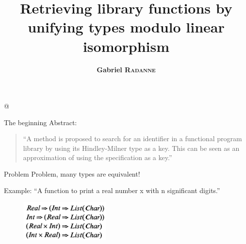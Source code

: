 \documentclass[aspectratio=169,dvipsnames,svgnames,10pt]{beamer}
\title{
  Retrieving library functions by unifying types modulo linear isomorphism\\
  


}
\author{\textbf{Gabriel \textsc{Radanne}}}
\date{}
\begin{document}
\lstMakeShortInline[keepspaces,basicstyle=\small\ttfamily]@


\begin{frame}{The beginning}
  Abstract:
  \begin{quote}
    ``A method is proposed to search for an identifier in a functional program library by using its
Hindley-Milner type as a key. This can be seen as an approximation of using the specification
as a key.''
  \end{quote}
\end{frame}

\begin{frame}{Problem}
  Problem, many types are equivalent!

  Example: ``A function to print a real number x with n significant digits.''
  \begin{figure}
    \centering
    \includegraphics[width=0.4\textwidth]{possibletypes}
  \end{figure}

\end{frame}
\end{document}
